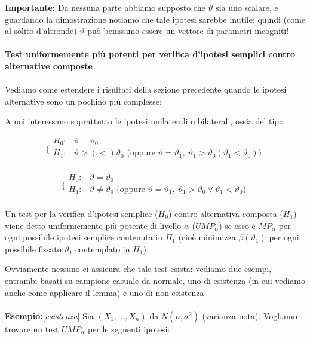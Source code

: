 \noindent \textbf{Importante:} Da nessuna parte abbiamo supposto che $\vartheta$ sia uno scalare, e guardando la dimostrazione notiamo che tale ipotesi sarebbe inutile: quindi (come al solito d'altronde) $\vartheta$ può benissimo essere un vettore di parametri incogniti!\\
\\
\noindent \textbf{Test uniformemente più potenti per verifica d'ipotesi semplici contro alternative composte}\\
\\
Vediamo come estendere i risultati della sezione precedente quando le ipotesi alternative sono un pochino più complesse:

A noi interessano soprattutto le ipotesi unilaterali o bilaterali, ossia del tipo

$$\bigg \{
\begin{array}{rl}
H_0: & \vartheta = \vartheta_0 \\
H_1: & \vartheta > (<) \vartheta_0 \text{ (oppure } \vartheta = \vartheta_1,\ \vartheta_1 > \vartheta_0 (\vartheta_1 < \vartheta_0) )\\
\end{array}
$$

$$\bigg \{
\begin{array}{rl}
H_0: & \vartheta = \vartheta_0 \\
H_1: & \vartheta \neq \vartheta_0 \text{ (oppure } \vartheta = \vartheta_1,\ \vartheta_1 > \vartheta_0 \vee \vartheta_1 < \vartheta_0 )\\
\end{array}
$$

\begin{definizione}
Un test per la verifica d'ipotesi semplice ($H_0$) contro alternativa composta ($H_1$) viene detto uniformemente più potente di livello $\alpha$ ($UMP_\alpha$) se esso è $MP_\alpha$ per ogni possibile ipotesi semplice contenuta in $H_1$ (cioè minimizza $\beta(\vartheta_1)$ per ogni possibile fissato $\vartheta_1$ contemplato in $H_1$).
\end{definizione}

Ovviamente nessuno ci assicura che tale test esista: vediamo due esempi, entrambi basati su campione casuale da normale, uno di esistenza (in cui vediamo anche come applicare il lemma) e uno di non esistenza.\\
\\
\textbf{Esempio:}[\textit{esistenza}] Sia $(X_1,...,X_n)$ da $N(\mu,\sigma^2)$ (varianza nota).
Vogliamo trovare un test $UMP_\alpha$ per le seguenti ipotesi:

